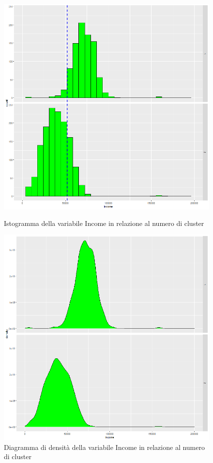 \documentclass[letterpaper,11pt]{article}
\begin{document}
\begin{figure}[H]
   \begin{minipage}{0.48\textwidth}
     \centering
         \includegraphics[width=1\textwidth]{Img/K-MEANS/KMEANS010.png}
    \caption{Istogramma della variabile Income in relazione al numero di cluster}
    \label{fig:incomeKmeansHistogram}
   \end{minipage}\hfill
   \begin{minipage}{0.48\textwidth}
     \centering
     \includegraphics[width=1\linewidth]{Img/K-MEANS/KMEANS011.png}
     \caption{Diagramma di densità della variabile Income in relazione al numero di cluster}\label{fig:incomeKmeansDensity}
   \end{minipage}
\end{figure}
\end{document}
